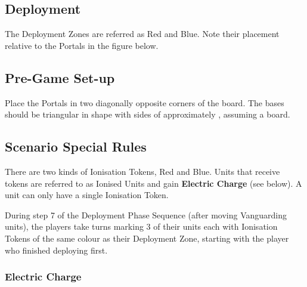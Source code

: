 
\label{GreatPortalsoftheBarrenMountains}


\subsection*{Deployment}

The Deployment Zones are referred as Red and Blue. Note their placement relative to the Portals in the figure below. 

\newcommand{\reddeploymentzone}{Red Deployment Zone}
\newcommand{\bluedeploymentzone}{Blue Deployment Zone}


\subsection*{Pre-Game Set-up}

Place the Portals in two diagonally opposite corners of the board. The bases should be triangular in shape with sides of approximately , assuming a  board.

\subsection*{Scenario Special Rules}

There are two kinds of Ionisation Tokens, Red and Blue. Units that receive tokens are referred to as Ionised Units and gain \textbf{Electric Charge} (see below). A unit can only have a single Ionisation Token.

During step 7 of the Deployment Phase Sequence (after moving Vanguarding units), the players take turns marking 3 of their units each with Ionisation Tokens of the same colour as their Deployment Zone, starting with the player who finished deploying first.

\subsubsection*{Electric Charge\titleruletype{\attackattribute}}

